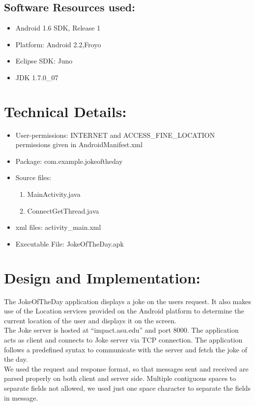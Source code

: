 \documentclass[11pt]{report}
\begin{document}
\subsection{Software Resources used:}
\begin{itemize}
\item Android 1.6 SDK, Release 1
\item Platform: Android 2.2,Froyo
\item Eclipse SDK: Juno
\item JDK 1.7.0\_07
\end{itemize}	

\section{Technical Details:}
\begin{itemize}
\item User-permissions: INTERNET and ACCESS\_FINE\_LOCATION permissions given in AndroidManifest.xml
\item Package: com.example.jokeoftheday
\item Source files: \begin{enumerate}
                            \item MainActivity.java
                            \item ConnectGetThread.java
                    \end{enumerate}
\item xml files:  activity\_main.xml
\item Executable File: JokeOfTheDay.apk
\end{itemize}

\section{Design and Implementation:}
The JokeOfTheDay application displays a joke on the users request. It also makes use of the Location services provided on the Android platform to determine the current location of the user and displays it on the screen.
\\[11pt ]The Joke server is hosted at “impact.asu.edu” and port 8000. The application acts as client and connects to Joke server via TCP connection. The application follows a predefined syntax to communicate with the server and fetch the joke of the day.
\\[11pt ]We used the request and response format, so that messages sent and received are parsed properly on both client and server side. Multiple contiguous spaces to separate fields not allowed, we used just one space character to separate the fields in message.
\end{document}

